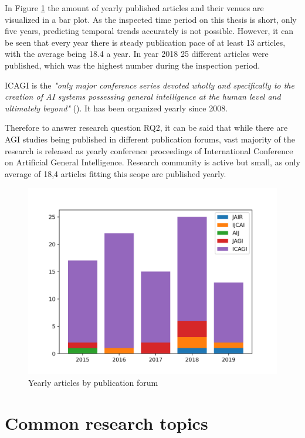 \documentclass[utf8,english]{gradu3}
\begin{document}
In Figure \ref{fig:yearlybar} the amount of yearly published articles and their
venues are visualized in a bar plot. As the inspected time period on this thesis
is short, only five years, predicting temporal trends accurately is not
possible. However, it can be seen that every year there is steady publication
pace of at least 13 articles, with the average being 18.4 a year. In year 2018
25 different articles were published, which was the highest number during the
inspection period.

ICAGI is the \emph{"only major conference series devoted wholly and specifically to
the creation of AI systems possessing general intelligence at the human level
and ultimately beyond"} (\cite{icagihome}). It has been organized yearly since
2008.

Therefore to answer research question RQ2, it can be said that while there are
AGI studies being published in different publication forums, vast majority of
the research is released as yearly conference proceedings of International
Conference on Artificial General Intelligence. Research community is active but
small, as only average of 18,4 articles fitting this scope are published yearly.

\begin{figure}[H]
  \centering
  \includegraphics[scale=0.60]{material/data/yearly_publications.png}
  \caption{Yearly articles by publication forum}
  \label{fig:yearlybar}
\end{figure}

\section{Common research topics}
\end{document}
